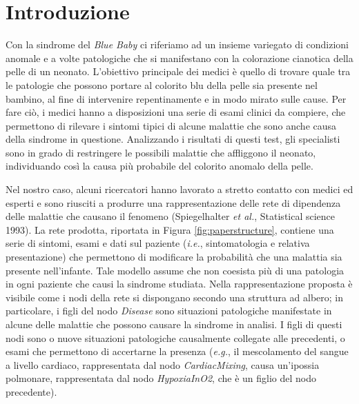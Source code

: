 \chapter{Introduzione}
Con la sindrome del \textit{Blue Baby} ci riferiamo ad un insieme variegato di condizioni anomale e a volte patologiche che si manifestano con la colorazione cianotica della pelle di un neonato.
L'obiettivo principale dei medici è quello di trovare quale tra le patologie che possono portare al colorito blu della pelle sia presente nel bambino, al fine di intervenire repentinamente e in modo mirato sulle cause. Per fare ciò, i medici hanno a disposizioni una serie di esami clinici da compiere, che permettono di rilevare i sintomi tipici di alcune malattie che sono anche causa della sindrome in questione. Analizzando i risultati di questi test, gli specialisti sono in grado di restringere le possibili malattie che affliggono il neonato, individuando così la causa più probabile del colorito anomalo della pelle.

Nel nostro caso, alcuni ricercatori hanno lavorato a stretto contatto con medici ed esperti e sono riusciti a produrre una rappresentazione delle rete di dipendenza delle malattie che causano il fenomeno (Spiegelhalter \textit{et al.}, Statistical science 1993). La rete prodotta, riportata in Figura \ref{fig:paperstructure}, contiene una serie di sintomi, esami e dati sul paziente (\textit{i.e.}, sintomatologia e relativa presentazione) che permettono di modificare la probabilità che una malattia sia presente nell'infante. Tale modello assume che non coesista più di una patologia in ogni paziente che causi la sindrome studiata. Nella rappresentazione proposta è visibile come i nodi della rete si dispongano secondo una struttura ad albero; in particolare, i figli del nodo \textit{Disease} sono situazioni patologiche manifestate in alcune delle malattie che possono causare la sindrome in analisi. I figli di questi nodi sono o nuove situazioni patologiche causalmente collegate alle precedenti, o esami che permettono di accertarne la presenza (\textit{e.g.}, il mescolamento del sangue a livello cardiaco, rappresentata dal nodo \textit{CardiacMixing}, causa un'ipossia polmonare, rappresentata dal nodo \textit{HypoxiaInO2}, che è un figlio del nodo precedente).
 
